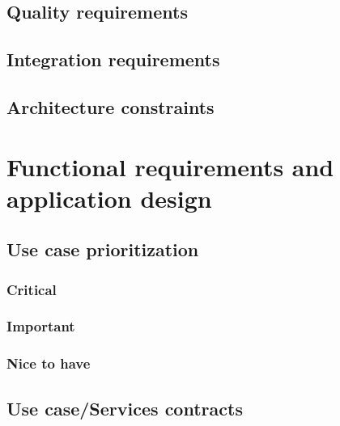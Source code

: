 \documentclass[a4paper, 12pt, oneside]{article}
\begin{document}
	\subsection{Quality requirements}
	\subsection{Integration requirements}
	\subsection{Architecture constraints}

\section{ Functional requirements and application design}
	\subsection{Use case prioritization}
		\subsubsection{Critical}
		\subsubsection{Important}
		\subsubsection{Nice to have}
	\subsection{Use case/Services contracts}
\end{document}
